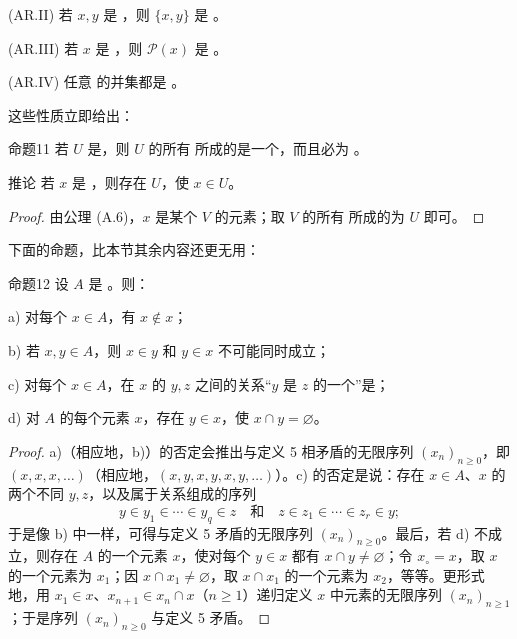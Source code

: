 (AR.II) 若 $x,y$ 是 ，则 $\{x,y\}$ 是 。

(AR.III) 若 $x$ 是 ，则 $\mathcal P(x)$ 是 。

(AR.IV) 任意 的并集都是 。

这些性质立即给出：
\begin{SGAresult}{命题}{11}
若 $U$ 是，则 $U$ 的所有 所成的是一个，而且必为 。
\end{SGAresult}
\begin{SGAresult}{推论}{}
若 $x$ 是 ，则存在  $U$，使 $x\in U$。
\end{SGAresult}
\begin{proof}
由公理 (A.6)，$x$ 是某个 $V$ 的元素；取 $V$ 的所有 所成的为 $U$ 即可。
\end{proof}
下面的命题，比本节其余内容还更无用：
\begin{SGAresult}{命题}{12}
设 $A$ 是 。则：

a) 对每个 $x\in A$，有 $x\notin x$；

b) 若 $x,y\in A$，则 $x\in y$ 和 $y\in x$ 不可能同时成立；

c) 对每个 $x\in A$，在 $x$ 的 $y,z$ 之间的关系“$y$ 是 $z$ 的一个”是；

d) 对 $A$ 的每个元素 $x$，存在 $y\in x$，使 $x\cap y=\varnothing$。
\end{SGAresult}
\begin{proof}
a)（相应地，b)）的否定会推出与定义 5 相矛盾的无限序列 $(x_n)_{n\geq0}$，即 $(x,x,x,\ldots)$（相应地，$(x,y,x,y,x,y,\ldots)$）。c) 的否定是说：存在 $x\in A$、$x$ 的两个不同 $y,z$，以及属于关系组成的序列
\[
 y\in y_1\in\cdots\in y_q\in z
 \quad\text{和}\quad
 z\in z_1\in\cdots\in z_r\in y;
\]
于是像 b) 中一样，可得与定义 5 矛盾的无限序列 $(x_n)_{n\geq0}$。最后，若 d) 不成立，则存在 $A$ 的一个元素 $x$，使对每个 $y\in x$ 都有 $x\cap y\ne\varnothing$；令 $x_\circ=x$，取 $x$ 的一个元素为 $x_1$；因 $x\cap x_1\ne\varnothing$，取 $x\cap x_1$ 的一个元素为 $x_2$，等等。更形式地，用 $x_1\in x$、$x_{n+1}\in x_n\cap x$（$n\geq1$）递归定义 $x$ 中元素的无限序列 $(x_n)_{n\geq1}$；于是序列 $(x_n)_{n\geq0}$ 与定义 5 矛盾。
\end{proof}
